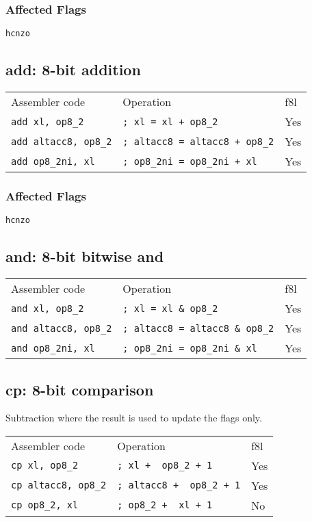 \documentclass{book}
\begin{document}
\subsubsection*{Affected Flags}

\texttt{hcnzo}


\subsection{add: 8-bit addition}

\begin{tabular}{l l l}
Assembler code            & Operation                                & f8l \\
\texttt{add xl, op8\_2}      & \texttt{; xl = xl + op8\_2}           & Yes \\
\texttt{add altacc8, op8\_2} & \texttt{; altacc8 = altacc8 + op8\_2} & Yes \\
\texttt{add op8\_2ni, xl}      & \texttt{; op8\_2ni = op8\_2ni + xl} & Yes
\end{tabular}

\subsubsection*{Affected Flags}

\texttt{hcnzo}


\subsection{and: 8-bit bitwise and}

\begin{tabular}{l l l}
Assembler code               & Operation                              & f8l \\
\texttt{and xl, op8\_2}      & \texttt{; xl = xl \& op8\_2}           & Yes \\
\texttt{and altacc8, op8\_2} & \texttt{; altacc8 = altacc8 \& op8\_2} & Yes \\
\texttt{and op8\_2ni, xl}    & \texttt{; op8\_2ni = op8\_2ni \& xl}   & Yes
\end{tabular}


\subsection{cp: 8-bit comparison}

Subtraction where the result is used to update the flags only.

\begin{tabular}{l l l}
Assembler code              & Operation                        & f8l\\
\texttt{cp xl, op8\_2}      & \texttt{; xl + ~op8\_2 + 1}      & Yes \\
\texttt{cp altacc8, op8\_2} & \texttt{; altacc8 + ~op8\_2 + 1} & Yes \\
\texttt{cp op8\_2, xl}      & \texttt{; op8\_2 + ~xl + 1}      & No
\end{tabular}
\end{document}
